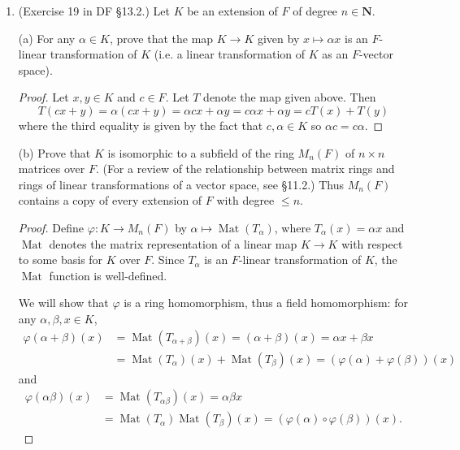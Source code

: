 \documentclass[10pt]{article}
\DeclareMathOperator*{\Mat}{Mat}
\begin{document}
\begin{enumerate}
\begin{proof}
Since $[K:F] = p$, if $F \subseteq E \subseteq K$ then either $[K:E] = p$ or $[K:E] = 1$, since $[K:E] \mid p$.  Therefore, by the previous paragraph, either $E = K$ or $E = F$.

\end{proof}






\item (Exercise 19 in DF \S 13.2.) Let $K$ be an extension of $F$ of degree $n \in \mathbf{N}$.

(a) For any $\alpha \in K$, prove that the map $K \rightarrow K$ given by $x \mapsto \alpha x$ is an $F$-linear transformation of $K$ (i.e. a linear transformation of $K$ as an $F$-vector space).

\begin{proof}

Let $x,y \in K$ and $c \in F$.  Let $T$ denote the map given above.  Then $$T(cx + y) = \alpha(cx+y) = \alpha cx + \alpha y = c \alpha x + \alpha y = c T(x) + T(y)$$ where the third equality is given by the fact that $c,\alpha \in K$ so $\alpha c = c \alpha$.

\end{proof}

(b) Prove that $K$ is isomorphic to a subfield of the ring $M_n(F)$ of $n \times n$ matrices over $F$.  (For a review of the relationship between matrix rings and rings of linear transformations of a vector space, see \S 11.2.)  Thus $M_n(F)$ contains a copy of every extension of $F$ with degree $\leq n$.

\begin{proof}

Define $\varphi: K \rightarrow M_n(F)$ by $\alpha \mapsto \Mat(T_{\alpha})$, where $T_{\alpha}(x) = \alpha x$ and $\Mat$ denotes the matrix representation of a linear map $K \rightarrow K$ with respect to some basis for $K$ over $F$.  Since $T_{\alpha}$ is an $F$-linear transformation of $K$, the $\Mat$ function is well-defined.

We will show that $\varphi$ is a ring homomorphism, thus a field homomorphism:  for any $\alpha, \beta, x \in K$, 
\begin{align*}
\varphi(\alpha + \beta)(x) &= \Mat(T_{\alpha + \beta})(x) = (\alpha + \beta)(x) = \alpha x + \beta x \\
&= \Mat(T_{\alpha})(x) + \Mat(T_{\beta})(x) = (\varphi(\alpha) + \varphi(\beta))(x)
\end{align*}
and
\begin{align*}
\varphi(\alpha \beta)(x) &= \Mat(T_{\alpha \beta})(x) = \alpha \beta x \\
&= \Mat(T_{\alpha}) \Mat(T_{\beta}) (x) = (\varphi(\alpha) \circ \varphi(\beta))(x).
\end{align*}


\end{proof}
\end{enumerate}
\end{document}
